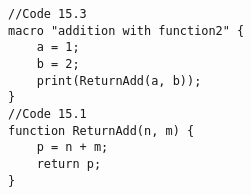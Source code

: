 \begin{lstlisting}[morekeywords={*,}]
//Code 15.3
macro "addition with function2" {
	a = 1;
	b = 2;
	print(ReturnAdd(a, b));
}
//Code 15.1
function ReturnAdd(n, m) {
	p = n + m;
	return p;
}

\end{lstlisting}